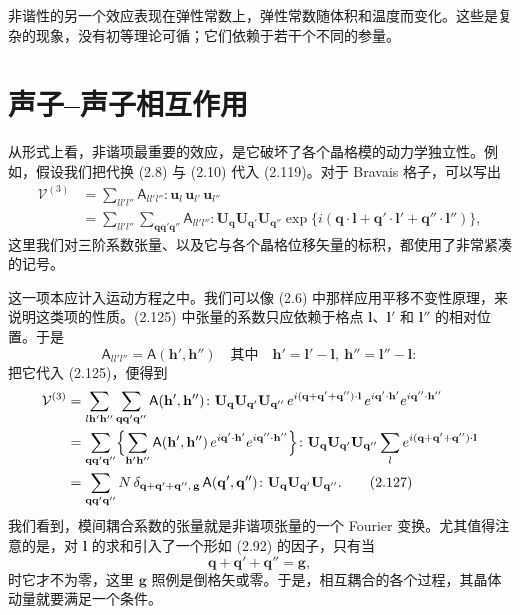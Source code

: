 非谐性的另一个效应表现在弹性常数上，弹性常数随体积和温度而变化。这些是复杂的现象，没有初等理论可循；它们依赖于若干个不同的参量。

\section{声子–声子相互作用}

从形式上看，非谐项最重要的效应，是它破坏了各个晶格模的动力学独立性。例如，假设我们把代换 (2.8) 与 (2.10) 代入 (2.119)。对于 Bravais 格子，可以写出
\begin{align*}
\mathcal{V}^{(3)} &= \sum_{ll'l''}\mathsf{A}_{ll'l''}\colon \mathbf{u}_l\,\mathbf{u}_{l'}\,\mathbf{u}_{l''}\\
&= \sum_{ll'l''}\sum_{\mathbf{q}\mathbf{q}'\mathbf{q}''}\mathsf{A}_{ll'l''}\colon \mathbf{U}_{\mathbf{q}}\mathbf{U}_{\mathbf{q}'}\mathbf{U}_{\mathbf{q}''}\exp\bigl\{i(\mathbf{q}\cdot\mathbf{l}+\mathbf{q}'\cdot\mathbf{l}'+\mathbf{q}''\cdot\mathbf{l}'')\bigr\},
\tag{2.125}
\end{align*}
这里我们对三阶系数张量、以及它与各个晶格位移矢量的标积，都使用了非常紧凑的记号。

这一项本应计入运动方程之中。我们可以像 (2.6) 中那样应用平移不变性原理，来说明这类项的性质。(2.125) 中张量的系数只应依赖于格点 $\mathbf{l}$、$\mathbf{l}'$ 和 $\mathbf{l}''$ 的相对位置。于是
\begin{equation*}
\mathsf{A}_{ll'l''}=\mathsf{A}(\mathbf{h}',\mathbf{h}'')\quad\text{其中}\quad \mathbf{h}'=\mathbf{l}'-\mathbf{l},\ \mathbf{h}''=\mathbf{l}''-\mathbf{l}:
\tag{2.126}
\end{equation*}
把它代入 (2.125)，便得到
\begin{align*}
\mathcal{V}^{(3)} &= \sum_{l\mathbf{h}'\mathbf{h}''}\sum_{\mathbf{q}\mathbf{q}'\mathbf{q}''}\mathsf{A}(\mathbf{h}',\mathbf{h}'')\colon \mathbf{U}_{\mathbf{q}}\mathbf{U}_{\mathbf{q}'}\mathbf{U}_{\mathbf{q}''}\,e^{i(\mathbf{q}+\mathbf{q}'+\mathbf{q}'')\cdot\mathbf{l}}\,e^{i\mathbf{q}'\cdot\mathbf{h}'}e^{i\mathbf{q}''\cdot\mathbf{h}''}\\
&= \sum_{\mathbf{q}\mathbf{q}'\mathbf{q}''}\Bigl\{\sum_{\mathbf{h}'\mathbf{h}''}\mathsf{A}(\mathbf{h}',\mathbf{h}'')\,e^{i\mathbf{q}'\cdot\mathbf{h}'}e^{i\mathbf{q}''\cdot\mathbf{h}''}\Bigr\}\colon \mathbf{U}_{\mathbf{q}}\mathbf{U}_{\mathbf{q}'}\mathbf{U}_{\mathbf{q}''}\sum_{l}e^{i(\mathbf{q}+\mathbf{q}'+\mathbf{q}'')\cdot\mathbf{l}}\\
&= \sum_{\mathbf{q}\mathbf{q}'\mathbf{q}''}N\,\delta_{\mathbf{q}+\mathbf{q}'+\mathbf{q}'',\,\mathbf{g}}\,\mathsf{A}(\mathbf{q}',\mathbf{q}'')\colon \mathbf{U}_{\mathbf{q}}\mathbf{U}_{\mathbf{q}'}\mathbf{U}_{\mathbf{q}''}.
\tag{2.127}
\end{align*}
我们看到，模间耦合系数的张量就是非谐项张量的一个 Fourier 变换。尤其值得注意的是，对 $\mathbf{l}$ 的求和引入了一个形如 (2.92) 的因子，只有当
\begin{equation*}
\mathbf{q}+\mathbf{q}'+\mathbf{q}''=\mathbf{g},
\tag{2.128}
\end{equation*}
时它才不为零，这里 $\mathbf{g}$ 照例是倒格矢或零。于是，相互耦合的各个过程，其晶体动量就要满足一个条件。

